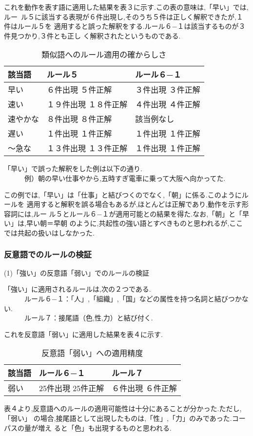 これを動作を表す語に適用した結果を表３に示す.この表の意味は,「早い」では,\mbox{ルー
ル５に}該当する表現が６件出現し,そのうち５件は正しく解釈できたが,１件はルール５を
適用すると誤った解釈をする.ルール６−１は該当するものが３件見つかり,３件とも正し
く解釈されたというものである.
\begin{table}[ht]
\caption{類似語へのルール適用の確からしさ}
\begin{center}
  \begin{tabular}{|l|l|l|} \hline
    該当語 & ルール５ & ルール６−１\\ \hline
    早い & ６件出現 ５件正解 & ３件出現 ３件正解\\ \hline
    速い & １９件出現 １８件正解 & ４件出現 ４件正解\\ \hline
    速やかな & ８件出現 ８件正解 & 該当例なし\\ \hline
    遅い & １件出現 １件正解 & １件出現 １件正解\\ \hline
    〜急な & １３件出現 １３件正解 & １件出現 １件正解\\ \hline
  \end{tabular}
\end{center}
\end{table}

「早い」で誤った解釈をした例は以下の通り.\\
　　　例）朝の早い仕事やから,五時すぎ電車に乗って大阪へ向かってた.

この例では,「早い」は「仕事」と結びつくのでなく,「朝」に係る.このようにルールを
適用すると解釈を誤る場合もあるが,ほとんどは正解であり,動作を示す形容詞には,ルー
ル５とルール６−１が適用可能との結果を得た.なお,「朝」と「早い」は,早い朝＝早朝
のように,共起性の強い語とすべきものと思われるが,ここでは共起の扱いはしなかった.

\subsubsection{反意語でのルールの検証}

\noindent
(1)「強い」の反意語「弱い」でのルールの検証

「強い」に適用されるルールは,次の２つである.\\
　　　ルール６−１：「人」,「組織」,「国」などの属性を持つ名詞と結びつかない.\\
　　　ルール７：接尾語（色,性,力）と結び付く.

これを反意語「弱い」に適用した結果を表４に示す.
\begin{table}[h]
\caption{反意語「弱い」への適用精度}
\begin{center}
  \begin{tabular}{|l|l|l|} \hline
    該当語 & ルール６−１ & ルール７ \\ \hline
    弱い & 25件出現 25件正解 & ６件出現 ６件正解 \\ \hline
  \end{tabular}
\end{center}
\end{table}
表４より,反意語へのルールの適用可能性は十分にあることが分かった.ただし,「弱い」
の場合,接尾語として出現したものは,「性」,「力」のみであった.コーパスの量が増え
ると「色」も出現するものと思われる.
\vspace{.5\baselineskip}

